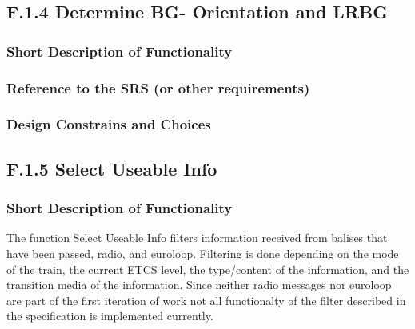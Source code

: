 \documentclass{template/openetcs_report}
\begin{document}


\subsection{F.1.4 Determine BG- Orientation and LRBG}

\subsubsection{Short Description of Functionality}
\subsubsection{Reference to the SRS (or other requirements)}
\subsubsection{Design Constrains and Choices}


\subsection{F.1.5 Select Useable Info}

\subsubsection{Short Description of Functionality}
The function Select Useable Info filters information received from balises that have been passed, radio, and euroloop. Filtering is done depending on the mode of the train, the current ETCS level, the type/content of the information, and the transition media of the information. Since neither radio messages nor euroloop are part of the first iteration of work not all functionalty of the filter described in the specification is implemented currently.
\end{document}
